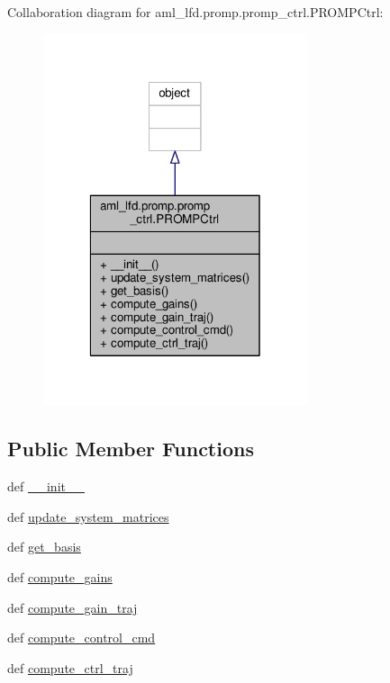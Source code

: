 Collaboration diagram for aml\-\_\-lfd.\-promp.\-promp\-\_\-ctrl.\-P\-R\-O\-M\-P\-Ctrl\-:\nopagebreak
\begin{figure}[H]
\begin{center}
\leavevmode
\includegraphics[width=220pt]{classaml__lfd_1_1promp_1_1promp__ctrl_1_1_p_r_o_m_p_ctrl__coll__graph}
\end{center}
\end{figure}
\subsection*{Public Member Functions}
\begin{DoxyCompactItemize}
\item 
def \hyperlink{classaml__lfd_1_1promp_1_1promp__ctrl_1_1_p_r_o_m_p_ctrl_a59ffdafad8cd7c38b10d832de14f81ba}{\-\_\-\-\_\-init\-\_\-\-\_\-}
\item 
def \hyperlink{classaml__lfd_1_1promp_1_1promp__ctrl_1_1_p_r_o_m_p_ctrl_a2d9172fcb2061f3a75738be0d1cec04f}{update\-\_\-system\-\_\-matrices}
\item 
def \hyperlink{classaml__lfd_1_1promp_1_1promp__ctrl_1_1_p_r_o_m_p_ctrl_a69c80dc881f0080ad1d4321db0be86f9}{get\-\_\-basis}
\item 
def \hyperlink{classaml__lfd_1_1promp_1_1promp__ctrl_1_1_p_r_o_m_p_ctrl_aa4f2e09432c78502d0c539d5f00bd479}{compute\-\_\-gains}
\item 
def \hyperlink{classaml__lfd_1_1promp_1_1promp__ctrl_1_1_p_r_o_m_p_ctrl_a45927c8b863935f08d4979a99b252741}{compute\-\_\-gain\-\_\-traj}
\item 
def \hyperlink{classaml__lfd_1_1promp_1_1promp__ctrl_1_1_p_r_o_m_p_ctrl_ae8ae663183befe2c2091471c2fb508cd}{compute\-\_\-control\-\_\-cmd}
\item 
def \hyperlink{classaml__lfd_1_1promp_1_1promp__ctrl_1_1_p_r_o_m_p_ctrl_a2ad503db99e10376b97446bb83388cb4}{compute\-\_\-ctrl\-\_\-traj}
\end{DoxyCompactItemize}


